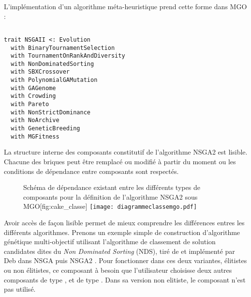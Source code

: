 L'implémentation d'un algorithme méta-heuristique prend cette forme dans MGO : 

\begin{listing}[H]

\begin{verbatim}

trait NSGAII <: Evolution
  with BinaryTournamentSelection
  with TournamentOnRankAndDiversity
  with NonDominatedSorting
  with SBXCrossover
  with PolynomialGAMutation
  with GAGenome
  with Crowding
  with Pareto
  with NonStrictDominance
  with NoArchive
  with GeneticBreeding
  with MGFitness

\end{verbatim}
\caption{Exemple de définition d'une méta-heuristique dans MGO}
\label{alg:nsga2}
\end{listing}

La structure interne des composants constitutif de l'algorithme NSGA2 est lisible. Chacune des briques peut être remplacé ou modifié à partir du moment ou les conditions de dépendance entre composants sont respectés. 

\begin{figure}[!htbp]
	\begin{sidecaption}[fortoc]{Schéma de dépendance existant entre les différents types de composants pour la définition de l'algorithme NSGA2 sous MGO}[fig:cake_classe]
		\centering
		\texttt{[image: diagrammeclassemgo.pdf]}{
		}
  \end{sidecaption}
\end{figure}

Avoir accès de façon lisible permet de mieux comprendre les différences entres les différents algorithmes. Prenons un exemple simple de construction d'algorithme génétique multi-objectif utilisant l'algorithme de classement de solution candidates dites du \textit{Non Dominated Sorting} (NDS), tiré de \autocite{Goldberg1989} et implémenté par Deb dans NSGA \autocite{Deb1994} puis NSGA2 \autocite{Deb2001}. Pour fonctionner dans ces deux variantes, élitistes ou non élitistes, ce composant à besoin que l'utilisateur choisisse deux autres composants de type , et de type . Dans sa version non elitiste, le composant  n'est pas utilisé.


